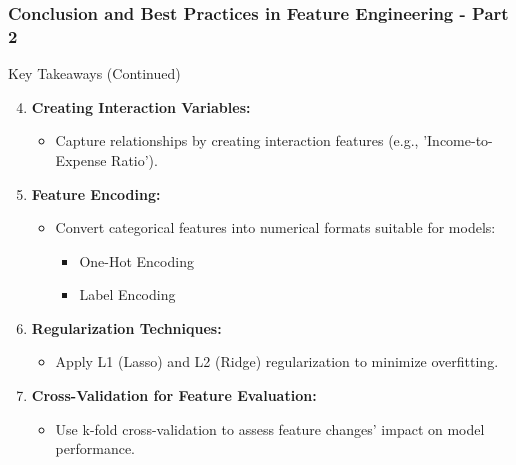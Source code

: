 \documentclass[aspectratio=169]{beamer}
\begin{document}
\begin{frame}[fragile]
  \frametitle{Conclusion and Best Practices in Feature Engineering - Part 2}
  
  \begin{block}{Key Takeaways (Continued)}
    \begin{enumerate}
      \setcounter{enumi}{3} %
      \item \textbf{Creating Interaction Variables:}
        \begin{itemize}
          \item Capture relationships by creating interaction features (e.g., 'Income-to-Expense Ratio').
        \end{itemize}
      
      \item \textbf{Feature Encoding:}
        \begin{itemize}
          \item Convert categorical features into numerical formats suitable for models:
            \begin{itemize}
              \item One-Hot Encoding
              \item Label Encoding
            \end{itemize}
        \end{itemize}
      
      \item \textbf{Regularization Techniques:}
        \begin{itemize}
          \item Apply L1 (Lasso) and L2 (Ridge) regularization to minimize overfitting.
        \end{itemize}
      
      \item \textbf{Cross-Validation for Feature Evaluation:}
        \begin{itemize}
          \item Use k-fold cross-validation to assess feature changes' impact on model performance.
        \end{itemize}
    \end{enumerate}
  \end{block}
\end{frame}
\end{document}

